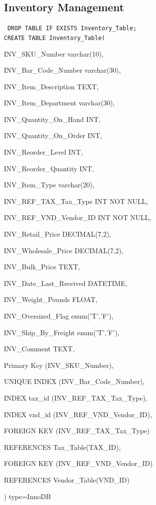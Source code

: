 \documentclass{report}
\begin{document}
        \subsection{Inventory Management}
        {\tt\small
        DROP TABLE IF EXISTS Inventory\_Table;\\

        CREATE TABLE Inventory\_Table(
        \begin{list}{}
            \item{INV\_SKU\_Number                  varchar(10),}
            \item{INV\_Bar\_Code\_Number             varchar(30),}
            \item{INV\_Item\_Description            TEXT,}
            \item{INV\_Item\_Department             varchar(30),}
            \item{INV\_Quantity\_On\_Hand            INT,}
            \item{INV\_Quantity\_On\_Order           INT,}
            \item{INV\_Reorder\_Level               INT,}
            \item{INV\_Reorder\_Quantity            INT,}
            \item{INV\_Item\_Type                   varchar(20),}
            \item{INV\_REF\_TAX\_Tax\_Type            INT NOT NULL,}
            \item{INV\_REF\_VND\_Vendor\_ID           INT NOT NULL,}
            \item{INV\_Retail\_Price                DECIMAL(7,2),}
            \item{INV\_Wholesale\_Price             DECIMAL(7,2),}
            \item{INV\_Bulk\_Price                  TEXT,}
            \item{INV\_Date\_Last\_Received          DATETIME,}
            \item{INV\_Weight\_Pounds               FLOAT,}
            \item{INV\_Oversized\_Flag              enum('T','F'),}
            \item{INV\_Ship\_By\_Freight             enum('T','F'),}
            \item{INV\_Comment                     TEXT,}
            \item{Primary Key (INV\_SKU\_Number),}
            \item{UNIQUE INDEX (INV\_Bar\_Code\_Number),}
            \item{INDEX tax\_id (INV\_REF\_TAX\_Tax\_Type),}
            \item{INDEX vnd\_id (INV\_REF\_VND\_Vendor\_ID),}
            \item{FOREIGN KEY (INV\_REF\_TAX\_Tax\_Type)}
            \item{REFERENCES Tax\_Table(TAX\_ID),}
            \item{FOREIGN KEY (INV\_REF\_VND\_Vendor\_ID)}
            \item{REFERENCES Vendor\_Table(VND\_ID)}
        \end{list}
        ) type=InnoDB\\
        }
\end{document}
